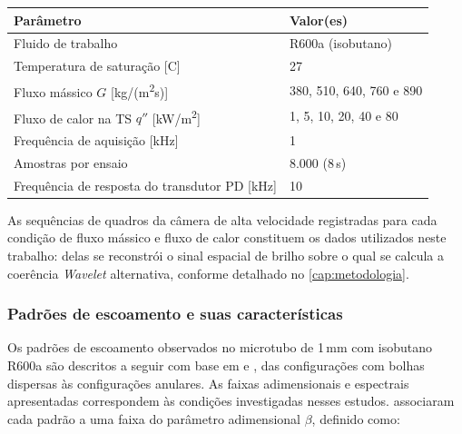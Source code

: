 \begin{quadro}[htb]
  \centering
  \caption{Parâmetros experimentais dos ensaios de .}
  \label{qua:params-exp}
  \begin{tabular}{ll}
    \hline
    \textbf{Parâmetro}                                        & \textbf{Valor(es)}           \\
    \hline
    Fluido de trabalho                                        & R600a (isobutano)            \\
    Temperatura de saturação [\textdegree{}C]                 & 27                           \\
    Fluxo mássico $G$ [kg/(m\textsuperscript{2}s)]           & 380, 510, 640, 760 e 890     \\
    Fluxo de calor na TS $q''$ [kW/m\textsuperscript{2}]     & 1, 5, 10, 20, 40 e 80        \\
    Frequência de aquisição [kHz]                             & 1                            \\
    Amostras por ensaio                                       & 8.000 (8\,s)                 \\
    Frequência de resposta do transdutor PD [kHz]            & 10                           \\
    \hline
  \end{tabular}
\end{quadro}

As sequências de quadros da câmera de alta velocidade registradas para cada condição de
fluxo mássico e fluxo de calor constituem os dados utilizados neste trabalho: delas se
reconstrói o sinal espacial de brilho sobre o qual se calcula a coerência \textit{Wavelet}
alternativa, conforme detalhado no \autoref{cap:metodologia}.

\subsubsection{Padrões de escoamento e suas características}\label{sec:padroes}

Os padrões de escoamento observados no microtubo de 1\,mm com isobutano R600a são
descritos a seguir com base em  e ,
das configurações com bolhas dispersas às configurações anulares. As faixas adimensionais
e espectrais apresentadas correspondem às condições investigadas nesses estudos.
 associaram cada padrão a uma faixa do parâmetro adimensional
$\beta$, definido como:

